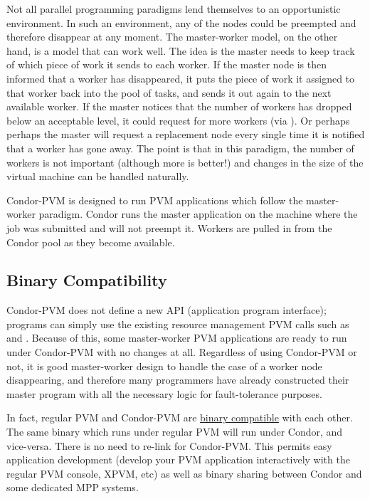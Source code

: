 Not all parallel programming paradigms lend themselves to an
opportunistic environment. In such an environment, any of the nodes
could be preempted and therefore disappear at any moment. The
master-worker model, on the other hand, is a model that can work well.
The idea is the master needs to keep track of which piece of work it
sends to each worker. If the master node is then informed that a worker
has disappeared, it puts the piece of work it assigned to that worker
back into the pool of tasks, and sends it out again to the next
available worker. If the master notices that the number of workers has
dropped below an acceptable level, it could request for more workers
(via ). Or perhaps perhaps the master will request
a replacement node every single time it is notified that a worker has
gone away. The point is that in this paradigm, the number of workers is
not important (although more is better!) and changes in the size of
the virtual machine can be handled naturally.

Condor-PVM is designed to run PVM applications which follow the
master-worker paradigm.  Condor runs the master application on the
machine where the job was submitted and will not preempt it.  Workers
are pulled in from the Condor pool as they become available.

\subsection{Binary Compatibility}

Condor-PVM does not define a new API (application program interface);
programs can simply use the existing resource management PVM calls such
as  and .  Because of this, some
master-worker PVM applications are ready to run under Condor-PVM with no
changes at all.  Regardless of using Condor-PVM or not, it is good
master-worker design to handle the case of a worker node disappearing,
and therefore many programmers have already constructed their master program
with all the necessary logic for fault-tolerance purposes.  

In fact, regular PVM and Condor-PVM are \underline{binary compatible}
with each other.  The same binary which runs under regular PVM will run
under Condor, and vice-versa.  There is no need to re-link for Condor-PVM.
This permits easy application development
(develop your PVM application interactively with the regular PVM console, XPVM,
etc) as well as binary sharing between Condor and some dedicated MPP systems.

